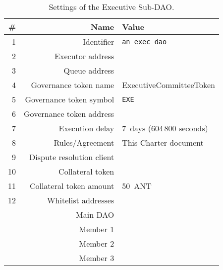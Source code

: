 \begin{table}[h!]
	\caption{Settings of the Executive Sub-DAO.}
	\centering
	\begin{tabular}{rrl}
		\toprule
		\# & Name & Value \\
		\midrule
		 1 & Identifier					& \href{https://govern.aragon.org/\#/daos/an_exec_dao}{\texttt{an\_exec\_dao}}\\
		 2 & Executor address			& \execSubDaoAddr\\
		 3 & Queue address				& \execSubDaoQueueAddr\\
		 4 & Governance token name		& ExecutiveCommitteeToken\\
		 5 & Governance token symbol	& \texttt{EXE}\\
		 6 & Governance token address	& \execSubDaoTokenAddr\\
		 7 & Execution delay			& 7~days (604\,800 seconds)\\
		 8 & Rules/Agreement			& This Charter document\\
		 9 & Dispute resolution client	& \aragonCourtAddr\\
		10 & Collateral token			& \antTokenAddr\\
		11 & Collateral token amount	& 50~\ac{ANT}\\
		12 & Whitelist addresses 		& \\
			& Main \ac{DAO}				& \mainDaoAddr\\
			& Member 1 					& \execSubDaoMemberAddrI\\
			& Member 2 					& \execSubDaoMemberAddrII\\
			& Member 3 					& \execSubDaoMemberAddrIII\\
		\bottomrule
	\end{tabular}
\end{table}

\clearpage


